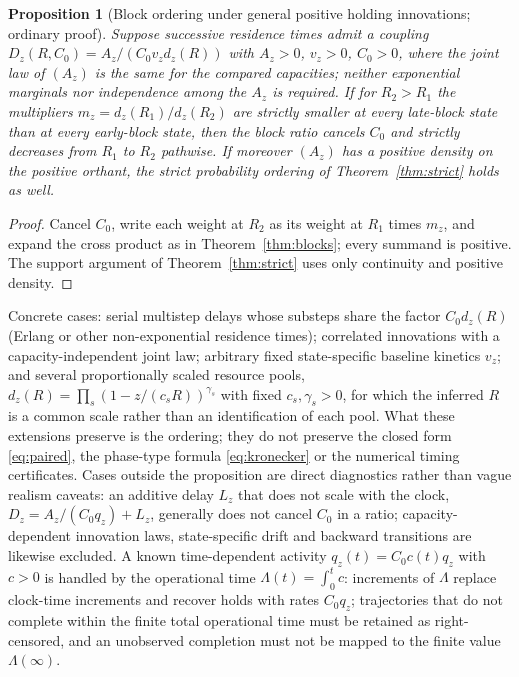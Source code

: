 \documentclass[11pt,a4paper]{article}
\theoremstyle{plain}
\newtheorem{proposition}[theorem]{Proposition}
\theoremstyle{definition}
\theoremstyle{remark}
\begin{document}
\begin{proposition}[Block ordering under general positive holding innovations; ordinary proof]\label{prop:general}
Suppose successive residence times admit a coupling $D_z(R,C_0)=A_z/(C_0v_zd_z(R))$ with $A_z>0$, $v_z>0$, $C_0>0$, where the joint law of $(A_z)$ is the same for the compared capacities; neither exponential marginals nor independence among the $A_z$ is required. If for $R_2>R_1$ the multipliers $m_z=d_z(R_1)/d_z(R_2)$ are strictly smaller at every late-block state than at every early-block state, then the block ratio cancels $C_0$ and strictly decreases from $R_1$ to $R_2$ pathwise. If moreover $(A_z)$ has a positive density on the positive orthant, the strict probability ordering of Theorem~\ref{thm:strict} holds as well.
\end{proposition}
\begin{proof}
Cancel $C_0$, write each weight at $R_2$ as its weight at $R_1$ times $m_z$, and expand the cross product as in Theorem~\ref{thm:blocks}; every summand is positive. The support argument of Theorem~\ref{thm:strict} uses only continuity and positive density.
\end{proof}
Concrete cases: serial multistep delays whose substeps share the factor $C_0d_z(R)$ (Erlang or other non-exponential residence times); correlated innovations with a capacity-independent joint law; arbitrary fixed state-specific baseline kinetics $v_z$; and several proportionally scaled resource pools, $d_z(R)=\prod_s(1-z/(c_sR))^{\gamma_s}$ with fixed $c_s,\gamma_s>0$, for which the inferred $R$ is a common scale rather than an identification of each pool. What these extensions preserve is the ordering; they do not preserve the closed form \eqref{eq:paired}, the phase-type formula \eqref{eq:kronecker} or the numerical timing certificates. Cases outside the proposition are direct diagnostics rather than vague realism caveats: an additive delay $L_z$ that does not scale with the clock, $D_z=A_z/(C_0q_z)+L_z$, generally does not cancel $C_0$ in a ratio; capacity-dependent innovation laws, state-specific drift and backward transitions are likewise excluded. A known time-dependent activity $q_z(t)=C_0c(t)q_z$ with $c>0$ is handled by the operational time $\Lambda(t)=\int_0^tc$: increments of $\Lambda$ replace clock-time increments and recover holds with rates $C_0q_z$; trajectories that do not complete within the finite total operational time must be retained as right-censored, and an unobserved completion must not be mapped to the finite value $\Lambda(\infty)$.
\end{document}
